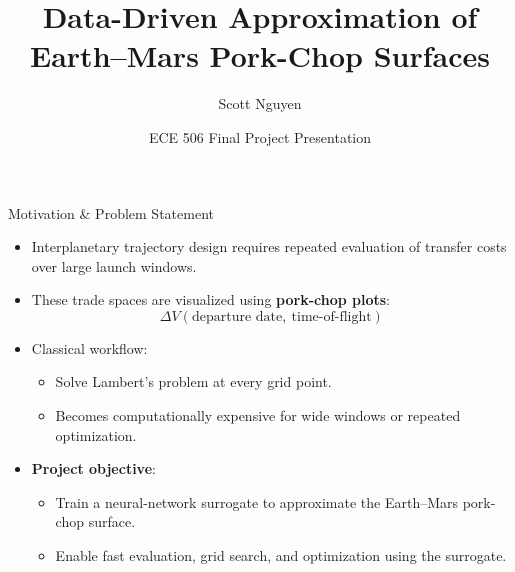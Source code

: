 \documentclass[aspectratio=169]{beamer}
\title[Earth--Mars Pork-Chop Surrogates]{Data-Driven Approximation of Earth--Mars Pork-Chop Surfaces}
\author[Scott Nguyen]{Scott Nguyen}
\institute[UNM]{Dept.\ of Electrical \& Computer Engineering \\ University of New Mexico}
\date{ECE 506 Final Project Presentation}
\begin{document}
	
	\begin{frame}
		\titlepage
	\end{frame}
	
	\begin{frame}{Motivation \& Problem Statement}
		\begin{itemize}
			\item Interplanetary trajectory design requires repeated evaluation of transfer costs over large launch windows.
			\item These trade spaces are visualized using \textbf{pork-chop plots}:
			\[
			\Delta V(\text{departure date},\ \text{time-of-flight})
			\]
			\item Classical workflow:
			\begin{itemize}
				\item Solve Lambert’s problem at every grid point.
				\item Becomes computationally expensive for wide windows or repeated optimization.
			\end{itemize}
			\item \textbf{Project objective}:
			\begin{itemize}
				\item Train a neural-network surrogate to approximate the Earth--Mars pork-chop surface.
				\item Enable fast evaluation, grid search, and optimization using the surrogate.
			\end{itemize}
		\end{itemize}
	\end{frame}
	
\end{document}
